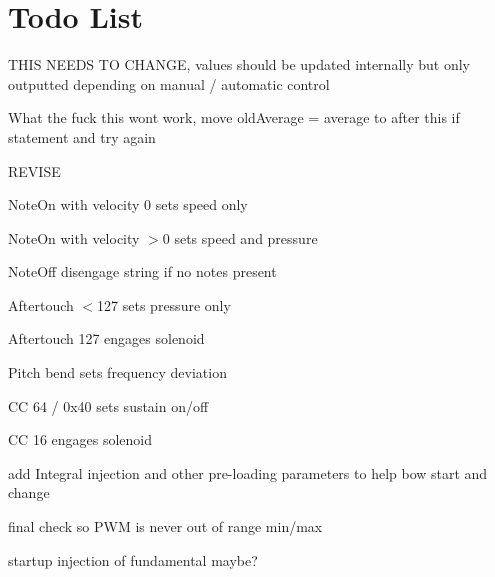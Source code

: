 \chapter{Todo List}
\hypertarget{todo}{}\label{todo}

\begin{DoxyRefList}
\item[File \doxylink{bowcontrol_8cpp}{bowcontrol.cpp} ]\label{todo__todo000001}%
%
THIS NEEDS TO CHANGE, values should be updated internally but only outputted depending on manual / automatic control  
\item[Member \doxylink{classDCMotorControl_a77964b1c2ef9755ef26d638b71668dd4}{DCMotor\+Control\+::get\+Average\+Tachometer\+Freq} ()]\label{todo__todo000002}%
%
What the fuck this wont work, move old\+Average = average to after this if statement and try again  
\item[File \doxylink{midi_8h}{midi.h} ]\label{todo__todo000004}%
%
REVISE
\begin{DoxyItemize}
\item Note\+On with velocity 0 sets speed only
\item Note\+On with velocity \texorpdfstring{$>$}{>}0 sets speed and pressure
\item Note\+Off disengage string if no notes present
\item Aftertouch \texorpdfstring{$<$}{<}127 sets pressure only
\item Aftertouch 127 engages solenoid
\item Pitch bend sets frequency deviation
\item CC 64 / 0x40 sets sustain on/off
\item CC 16 engages solenoid 
\end{DoxyItemize}
\item[Member \doxylink{classPIDController_a04e654ba7d6720fa68bb74946c0b138d}{PIDController\+::pid\+Control} ()]\label{todo__todo000003}%
%
add Integral injection and other pre-\/loading parameters to help bow start and change 



final check so PWM is never out of range min/max 



startup injection of fundamental maybe? 
\end{DoxyRefList}